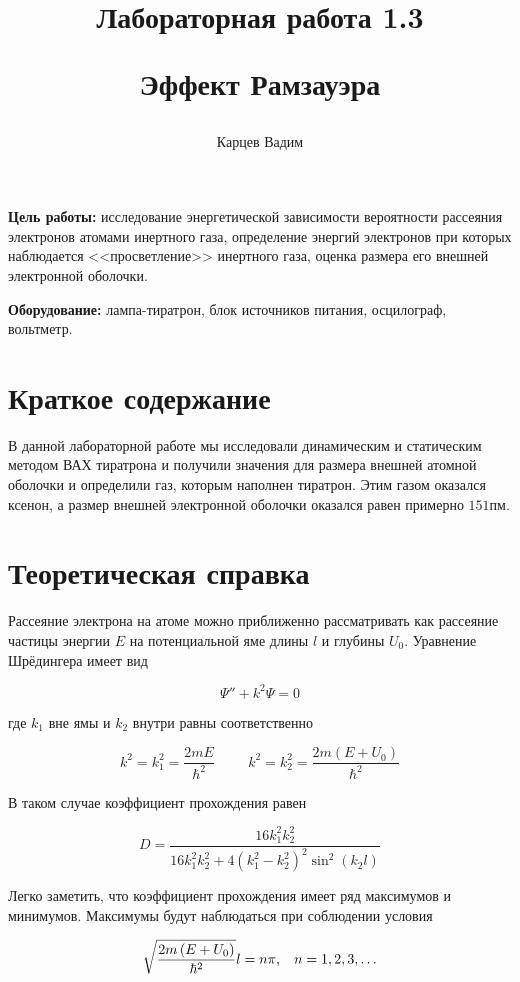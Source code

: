 \documentclass[12pt]{article}
\author{Карцев Вадим}
\title{Лабораторная работа 1.3

Эффект Рамзауэра}
\begin{document}
  \maketitle

  \textbf{Цель работы:} исследование энергетической зависимости вероятности
  рассеяния электронов атомами инертного газа, определение энергий электронов
  при которых наблюдается <<просветление>> инертного газа, оценка размера его
  внешней электронной оболочки.

  \textbf{Оборудование:} лампа-тиратрон, блок источников питания, осцилограф,
  вольтметр.

  \section{Краткое содержание}

    В данной лабораторной работе мы исследовали динамическим и статическим
    методом ВАХ тиратрона и получили значения для размера внешней атомной
    оболочки и определили газ, которым наполнен тиратрон. Этим газом оказался
    ксенон, а размер внешней электронной оболочки оказался равен примерно
    $151 пм$.

  \section{Теоретическая справка}

    Рассеяние электрона на атоме можно приближенно рассматривать как рассеяние
    частицы энергии $E$ на потенциальной яме длины $l$ и глубины $U_0$.
    Уравнение Шрёдингера имеет вид

    $$
      \Psi'' + k^2 \Psi = 0
    $$

    где $k_1$ вне ямы и $k_2$ внутри равны соответственно

    $$
      k^2 = k_1^2 = \frac{2 m E}{\hbar^2}
      \hspace{1cm}
      k^2 = k_2^2 = \frac{2 m \left(E + U_0\right)}{\hbar^2}
    $$

    В таком случае коэффициент прохождения равен

    $$
      D = \frac{16 k_1^2 k_2^2}{16 k_1^2 k_2^2 + 4 \left(k_1^2 - k_2^2\right)^2
      \sin^2 \left(k_2 l\right)}
    $$

    Легко заметить, что коэффициент прохождения имеет ряд максимумов и минимумов.
    Максимумы будут наблюдаться при соблюдении условия

    \begin{equation}
      \sqrt{\frac{2 m \left(E + U_0\right)}{\hbar^2}} l = n \pi, \hspace{0.3cm}
      n = 1, 2, 3, \ldots
      \label{eq:maximums}
    \end{equation}
\end{document}

